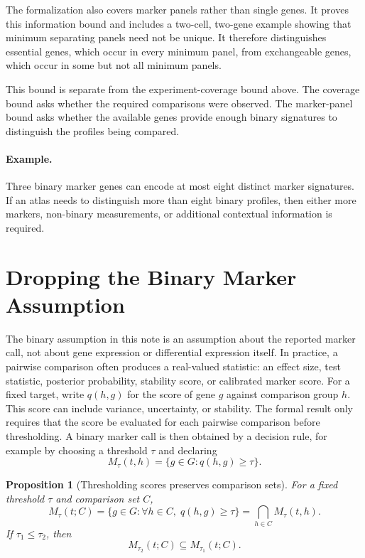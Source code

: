 \documentclass{article}
\newtheorem{proposition}{Proposition}
\begin{document}
The formalization also covers marker panels rather than single genes. It proves this information bound and includes a two-cell, two-gene example showing that minimum separating panels need not be unique. It therefore distinguishes essential genes, which occur in every minimum panel, from exchangeable genes, which occur in some but not all minimum panels.

This bound is separate from the experiment-coverage bound above. The coverage bound asks whether the required comparisons were observed. The marker-panel bound asks whether the available genes provide enough binary signatures to distinguish the profiles being compared.

\paragraph{Example.}
Three binary marker genes can encode at most eight distinct marker signatures. If an atlas needs to distinguish more than eight binary profiles, then either more markers, non-binary measurements, or additional contextual information is required.

\section{Dropping the Binary Marker Assumption}

The binary assumption in this note is an assumption about the reported marker call, not about gene expression or differential expression itself. In practice, a pairwise comparison often produces a real-valued statistic: an effect size, test statistic, posterior probability, stability score, or calibrated marker score. For a fixed target, write $q(h,g)$ for the score of gene $g$ against comparison group $h$. This score can include variance, uncertainty, or stability. The formal result only requires that the score be evaluated for each pairwise comparison before thresholding. A binary marker call is then obtained by a decision rule, for example by choosing a threshold $\tau$ and declaring
\[
  M_{\tau}(t,h)=\{g\in G:q(h,g)\geq \tau\}.
\]

\begin{proposition}[Thresholding scores preserves comparison sets]\label{prop:score-thresholding-preserves-scope}
For a fixed threshold $\tau$ and comparison set $C$,
\[
  M_{\tau}(t;C)
  =
  \{g\in G:\forall h\in C,\; q(h,g)\geq \tau\}
  =
  \bigcap_{h\in C} M_{\tau}(t,h).
\]
If $\tau_1\leq \tau_2$, then
\[
  M_{\tau_2}(t;C)\subseteq M_{\tau_1}(t;C).
\]
\end{proposition}
\end{document}

